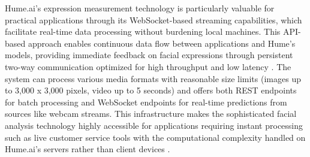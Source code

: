 Hume.ai's expression measurement technology is particularly valuable for practical applications through its WebSocket-based streaming capabilities, which facilitate real-time data processing without burdening local machines. This API-based approach enables continuous data flow between applications and Hume's models, providing immediate feedback on facial expressions through persistent two-way communication optimized for high throughput and low latency \citep{hume_api_2025}. The system can process various media formats with reasonable size limits (images up to 3,000 x 3,000 pixels, video up to 5 seconds) and offers both REST endpoints for batch processing and WebSocket endpoints for real-time predictions from sources like webcam streams. This infrastructure makes the sophisticated facial analysis technology highly accessible for applications requiring instant processing such as live customer service tools with the computational complexity handled on Hume.ai's servers rather than client devices \citep{hume_expression_2025a}.


